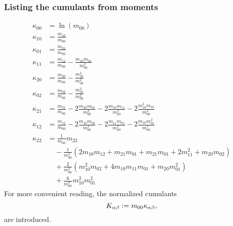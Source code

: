 \documentclass{article}
\begin{document}
\subsubsection{Listing the cumulants from moments}
\label{subs:Listing the cumulants from moments}
\begin{align}
  \kappa_{00} & = \ln(m_{00}) \\
  \kappa_{10} & = \frac{m_{10}}{m_{00}} \\
  \kappa_{01} & = \frac{m_{01}}{m_{00}} \\
  \kappa_{11} & = \frac{m_{11}}{m_{00}} - \frac{m_{10}m_{01}}{m_{00}^2} \\
  \kappa_{20} & = \frac{m_{20}}{m_{00}} - \frac{m_{10}^2}{m_{00}^2} \\
  \kappa_{02} & = \frac{m_{02}}{m_{00}} - \frac{m_{01}^2}{m_{00}^2} \\
  \kappa_{21} & = \frac{m_{21}}{m_{00}} - 2\frac{m_{20}m_{01}}{m_{00}^2}
            - 2\frac{m_{10}m_{11}}{m_{00}^2} - 2\frac{m_{10}^2 m_{01}}{m_{00}^3} \\
  \kappa_{12} & = \frac{m_{12}}{m_{00}} - 2\frac{m_{10}m_{02}}{m_{00}^2}
            - 2\frac{m_{11}m_{01}}{m_{00}^2} - 2\frac{m_{10} m_{01}^2}{m_{00}^3} \\
  \kappa_{22} & = \frac{1}{m_{00}} m_{22} \\
    &\quad
    - \frac{1}{m_{00}^2}
    \left(
       2 m_{10}m_{12}  + m_{21}m_{01} + m_{21}m_{01} + 2 m_{11}^2 + m_{20}m_{02}
    \right) \\
    &\quad
    + \frac{2}{m_{00}^3}
      \left(
        m_{10}^2 m_{02} + 4 m_{10}m_{11}m_{01} + m_{20}m_{01}^2
      \right)\\
    &\quad
       + \frac{6}{m_{00}^4} m_{10}^2 m_{01}^2
\end{align}
For more convenient reading, the normalized cumulants
\begin{equation}
  \label{eq: definition normalized cumulants}
  K_{\alpha\beta} \mathrel{\mathop:}= m_{00}\kappa_{\alpha\beta},
\end{equation}
are introduced.
\end{document}
